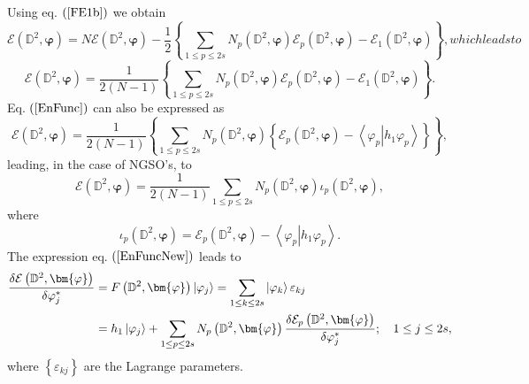 \documentclass{preprint}
\begin{document}
Using eq. $\left( \ref{FE1b}\right) $ we obtain
\begin{subequations}
\begin{equation}
\mathcal{E}\left( \mathbb{D}^{2},\bm{\varphi}\right) =N\mathcal{E}\left(
\mathbb{D}^{2},\bm{\varphi}\right) -\frac{1}{2}\left\{ \sum_{1\leq p\leq
2s}N_{p}\left( \mathbb{D}^{2},\bm{\varphi}\right) \mathcal{E}_{p}\left(
\mathbb{D}^{2},\bm{\varphi}\right) -\mathcal{E}_{1}\left( \mathbb{D}^{2},%
\bm{\varphi}\right) \right\} ,
\end{equation}
which leads to
\end{subequations}
\begin{equation}
\mathcal{E}\left( \mathbb{D}^{2},\bm{\varphi}\right) =\frac{1}{2\left(
N-1\right) }\left\{ \sum_{1\leq p\leq2s}N_{p}\left( \mathbb{D}^{2},%
\bm{\varphi}\right) \mathcal{E}_{p}\left( \mathbb{D}^{2},\bm{\varphi}\right)
-\mathcal{E}_{1}\left( \mathbb{D}^{2},\bm{\varphi}\right) \right\} .
\label{EnFunc}
\end{equation}
Eq. $\left( \ref{EnFunc}\right) $ can also be expressed as
\begin{equation}
\mathcal{E}\left( \mathbb{D}^{2},\bm{\varphi}\right) =\frac{1}{2\left(
N-1\right) }\left\{ \sum_{1\leq p\leq2s}N_{p}\left( \mathbb{D}^{2},%
\bm{\varphi}\right) \left\{ \mathcal{E}_{p}\left( \mathbb{D}^{2},\bm{\varphi}%
\right) -\left\langle \left. \varphi_{p}\right\vert
h_{1}\varphi_{p}\right\rangle \right\} \right\} ,  \label{EnFuncNew}
\end{equation}
leading, in the case of NGSO's, to
\begin{equation}
\mathcal{E}\left( \mathbb{D}^{2},\bm{\varphi}\right) =\frac{1}{2\left(
N-1\right) }\sum_{1\leq p\leq2s}N_{p}\left( \mathbb{D}^{2},\bm{\varphi }%
\right) \iota_{p}\left( \mathbb{D}^{2},\bm{\varphi}\right) ,
\end{equation}
where
\begin{equation}
\iota_{p}\left( \mathbb{D}^{2},\bm{\varphi}\right) =\mathcal{E}_{p}\left(
\mathbb{D}^{2},\bm{\varphi}\right) -\left\langle \left. \varphi
_{p}\right\vert h_{1}\varphi_{p}\right\rangle .
\end{equation}
The expression eq. $\left( \ref{EnFuncNew}\right) $ leads to
\begin{align}
\frac{\delta\mathcal{E}\left( \mathbb{D}^{2},\bm{\varphi}\right) }{%
\delta\varphi_{j}^{\ast}} & =F\left( \mathbb{D}^{2},\bm{\varphi }\right)
\left\vert \varphi_{j}\right\rangle =\sum_{1\leq k\leq2s}\left\vert
\varphi_{k}\right\rangle \varepsilon_{kj}  \notag \\
& =h_{1}\left\vert \varphi_{j}\right\rangle +\sum_{1\leq p\leq2s}N_{p}\left(
\mathbb{D}^{2},\bm{\varphi}\right) \frac{\delta\mathcal{E}_{p}\left( \mathbb{%
D}^{2},\bm{\varphi}\right) }{\delta\varphi_{j}^{\ast}};\quad1\leq j\leq2s,
\end{align}
where $\left\{ \varepsilon_{kj}\right\} $ are the Lagrange parameters.



\end{document}
